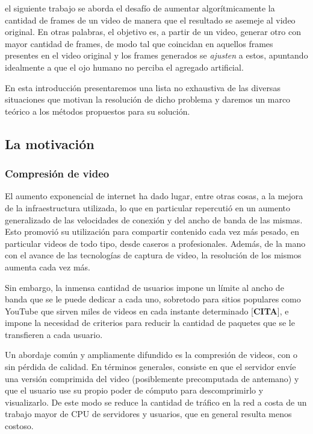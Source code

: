  el siguiente trabajo se aborda el desafío de aumentar algorítmicamente la cantidad de frames de un video de manera que el resultado se asemeje al video original. En otras palabras, el objetivo es, a partir de un video, generar otro con mayor cantidad de frames, de modo tal que coincidan en aquellos frames presentes en el video original y los frames generados se \emph{ajusten} a estos, apuntando idealmente a que el ojo humano no perciba el agregado artificial.

En esta introducción presentaremos una lista no exhaustiva de las diversas situaciones que motivan la resolución de dicho problema y daremos un marco teórico a los métodos propuestos para su solución.

\subsection{La motivación}
\subsubsection{Compresión de video}
El aumento exponencial de internet ha dado lugar, entre otras cosas\cite{TP2}, a la mejora de la infraestructura utilizada, lo que en particular repercutió en un aumento generalizado de las velocidades de conexión y del ancho de banda de las mismas. Esto promovió su utilización para compartir contenido cada vez más pesado, en particular videos de todo tipo, desde caseros a profesionales. Además, de la mano con el avance de las tecnologías de captura de video, la resolución de los mismos aumenta cada vez más.

Sin embargo, la inmensa cantidad de usuarios impone un límite al ancho de banda que se le puede dedicar a cada uno, sobretodo para sitios populares como YouTube que sirven miles de videos en cada instante determinado [\textbf{CITA}], e impone la necesidad de criterios para reducir la cantidad de paquetes que se le transfieren a cada usuario.

Un abordaje común y ampliamente difundido es la compresión de videos, con o sin pérdida de calidad. En términos generales, consiste en que el servidor envíe una versión comprimida del video (posiblemente precomputada de antemano) y que el usuario use su propio poder de cómputo para descomprimirlo y visualizarlo. De este modo se reduce la cantidad de tráfico en la red a costa de un trabajo mayor de CPU de servidores y usuarios, que en general resulta menos costoso.

